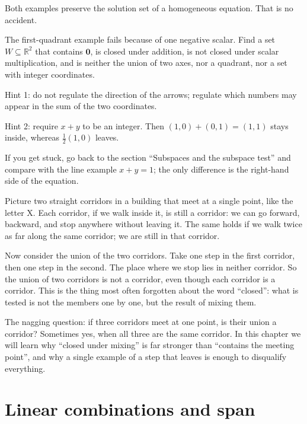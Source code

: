 Both examples preserve the solution set of a homogeneous equation. That is no accident.
\begin{tantangan}
The first-quadrant example fails because of one negative scalar. Find a set
$W\subseteq\mathbb{R}^{2}$ that contains $\mathbf{0}$, is closed under addition, is not closed
under scalar multiplication, and is neither the union of two axes, nor a quadrant, nor a set with
integer coordinates.

Hint 1: do not regulate the direction of the arrows; regulate which numbers may appear in the sum
of the two coordinates.

Hint 2: require $x+y$ to be an integer. Then $(1,0)+(0,1)=(1,1)$ stays inside, whereas
$\tfrac{1}{2}(1,0)$ leaves.

If you get stuck, go back to the section ``Subspaces and the subspace test'' and compare with the
line example $x+y=1$; the only difference is the right-hand side of the equation.
\end{tantangan}



\begin{untukanak}
Picture two straight corridors in a building that meet at a single point, like the letter X. Each
corridor, if we walk inside it, is still a corridor: we can go forward, backward, and stop
anywhere without leaving it. The same holds if we walk twice as far along the same corridor; we
are still in that corridor.

Now consider the union of the two corridors. Take one step in the first corridor, then one step in
the second. The place where we stop lies in neither corridor. So the union of two corridors is not
a corridor, even though each corridor is a corridor. This is the thing most often forgotten about
the word ``closed'': what is tested is not the members one by one, but the result of mixing them.

The nagging question: if three corridors meet at one point, is their union a corridor? Sometimes
yes, when all three are the same corridor. In this chapter we will learn why ``closed under
mixing'' is far stronger than ``contains the meeting point'', and why a single example of a step
that leaves is enough to disqualify everything.
\end{untukanak}

\section{Linear combinations and span}

